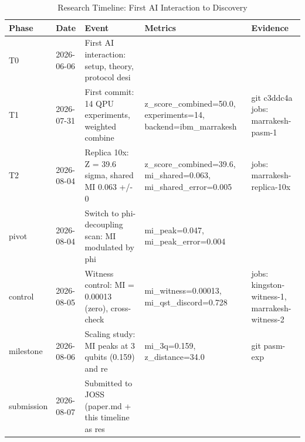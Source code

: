 \begin{table}[ht]
\centering
\caption{Research Timeline: First AI Interaction to Discovery}
\label{tab:timeline}
\begin{tabular}{lllll}
\toprule
\textbf{Phase} & \textbf{Date} & \textbf{Event} & \textbf{Metrics} & \textbf{Evidence} \\
\midrule
T0 & 2026-06-06 & First AI interaction: setup, theory, protocol desi &  &  \\
T1 & 2026-07-31 & First commit: 14 QPU experiments, weighted combine & z_score_combined=50.0, experiments=14, backend=ibm_marrakesh & git c3ddc4a jobs: marrakesh-pasm-1  \\
T2 & 2026-08-04 & Replica 10x: Z = 39.6 sigma, shared MI 0.063 +/- 0 & z_score_combined=39.6, mi_shared=0.063, mi_shared_error=0.005 & jobs: marrakesh-replica-10x  \\
pivot & 2026-08-04 & Switch to phi-decoupling scan: MI modulated by phi & mi_peak=0.047, mi_peak_error=0.004 &  \\
control & 2026-08-05 & Witness control: MI = 0.00013 (zero), cross-check  & mi_witness=0.00013, mi_qst_discord=0.728 & jobs: kingston-witness-1, marrakesh-witness-2  \\
milestone & 2026-08-06 & Scaling study: MI peaks at 3 qubits (0.159) and re & mi_3q=0.159, z_distance=34.0 & git pasm-exp  \\
submission & 2026-08-07 & Submitted to JOSS (paper.md + this timeline as res &  &  \\
\bottomrule
\end{tabular}
\end{table}